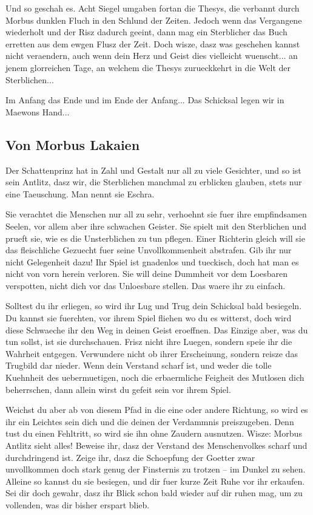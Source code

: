 \documentclass[a5paper,8pt]{book}
\begin{document}
Und so geschah es. Acht Siegel umgaben fortan die Thesys, die verbannt durch Morbus dunklen Fluch in den Schlund der Zeiten. Jedoch wenn das Vergangene wiederholt und der Risz dadurch geeint, dann mag ein Sterblicher das Buch erretten aus dem ewgen Flusz der Zeit. Doch wisze, dasz was geschehen kannst nicht veraendern, auch wenn dein Herz und Geist dies vielleicht wuenscht... an jenem glorreichen Tage, an welchem die Thesys zurueckkehrt in die Welt der Sterblichen... 

Im Anfang das Ende und im Ende der Anfang... Das Schicksal legen wir in Maewons Hand... 

\newpage

\subsection{ Von Morbus Lakaien}

Der Schattenprinz hat in Zahl und Gestalt nur all zu viele Gesichter, und so ist sein Antlitz, dasz wir, die Sterblichen manchmal zu erblicken glauben, stets nur eine Taeuschung. Man nennt sie Eschra.

Sie verachtet die Menschen nur all zu sehr, verhoehnt sie fuer ihre empfindsamen Seelen, vor allem aber ihre schwachen Geister. Sie spielt mit den Sterblichen und prueft sie, wie es die Unsterblichen zu tun pflegen. Einer Richterin gleich will sie das fleischliche Gezuecht fuer seine Unvollkommenheit abstrafen. Gib ihr nur nicht Gelegenheit dazu! Ihr Spiel ist gnadenlos und tueckisch, doch hat man es nicht von vorn herein verloren. Sie will deine Dummheit vor dem Loesbaren verspotten, nicht dich vor das Unloesbare stellen. Das waere ihr zu einfach.

Solltest du ihr erliegen, so wird ihr Lug und Trug dein Schicksal bald besiegeln. Du kannst sie fuerchten, vor ihrem Spiel fliehen wo du es witterst, doch wird diese Schwaeche ihr den Weg in deinen Geist eroeffnen. Das Einzige aber, was du tun sollst, ist sie durchschauen. Frisz nicht ihre Luegen, sondern speie ihr die Wahrheit entgegen. Verwundere nicht ob ihrer Erscheinung, sondern reisze das Trugbild dar nieder. Wenn dein Verstand scharf ist, und weder die tolle Kuehnheit des uebermuetigen, noch die erbaermliche Feigheit des Mutlosen dich beherrschen, dann allein wirst du gefeit sein vor ihrem Spiel.

Weichst du aber ab von diesem Pfad in die eine oder andere Richtung, so wird es ihr ein Leichtes sein dich und die deinen der Verdammnis preiszugeben. Denn tust du einen Fehltritt, so wird sie ihn ohne Zaudern ausnutzen. Wisze: Morbus Antlitz sieht alles! Beweise ihr, dasz der Verstand des Menschenvolkes scharf und durchdringend ist. Zeige ihr, dasz die Schoepfung der Goetter zwar unvollkommen doch stark genug der Finsternis zu trotzen – im Dunkel zu sehen. Alleine so kannst du sie besiegen, und dir fuer kurze Zeit Ruhe vor ihr erkaufen. Sei dir doch gewahr, dasz ihr Blick schon bald wieder auf dir ruhen mag, um zu vollenden, was dir bisher erspart blieb.
\end{document}
